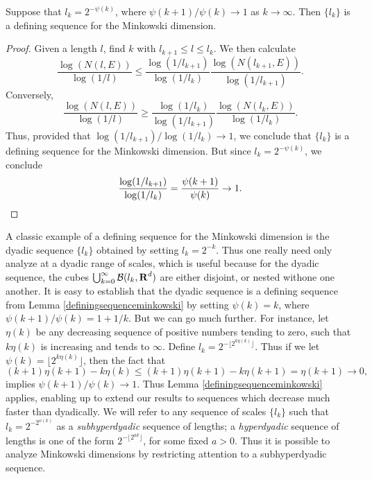 \begin{lemma} \label{definingsequenceminkowski}
	Suppose that $l_k = 2^{-\psi(k)}$, where $\psi(k+1)/\psi(k) \to 1$ as $k \to \infty$. Then $\{ l_k \}$ is a defining sequence for the Minkowski dimension.
\end{lemma}
\begin{proof}
	Given a length $l$, find $k$ with $l_{k+1} \leq l \leq l_k$. We then calculate
	\[ \frac{\log(N(l,E))}{\log(1/l)} \leq \frac{\log(1/l_{k+1})}{\log(1/l_k)} \frac{\log(N(l_{k+1},E))}{\log(1/l_{k+1})}. \]
	Conversely,
	\[ \frac{\log(N(l,E))}{\log(1/l)} \geq \frac{\log(1/l_k)}{\log(1/l_{k+1})} \frac{\log(N(l_k,E))}{\log(1/l_k)}. \]
	Thus, provided that $\log(1/l_{k+1})/\log(1/l_k) \to 1$, we conclude that $\{ l_k \}$ is a defining sequence for the Minkowski dimension. But since $l_k = 2^{-\psi(k)}$, we conclude
	\[ \frac{\log(1/l_{k+1})}{\log(1/l_k)} = \frac{\psi(k+1)}{\psi(k)} \to 1. \qedhere \]
\end{proof}

A classic example of a defining sequence for the Minkowski dimension is the dyadic sequence $\{ l_k \}$ obtained by setting $l_k = 2^{-k}$. Thus one really need only analyze at a dyadic range of scales, which is useful because for the dyadic sequence, the cubes $\bigcup_{k = 0}^\infty \operatorname{\mathcal{B}}(l_k, \operatorname{\mathbf{R}}^d)$ are either disjoint, or nested withone one another. It is easy to establish that the dyadic sequence is a defining sequence from Lemma \ref{definingsequenceminkowski} by setting $\psi(k) = k$, where $\psi(k+1)/\psi(k) = 1 + 1/k$. But we can go much further. For instance, let $\eta(k)$ be any decreasing sequence of positive numbers tending to zero, such that $k \eta(k)$ is increasing and tends to $\infty$. Define $l_k = 2^{-\lfloor 2^{k \eta(k)} \rfloor}$. Thus if we let $\psi(k) = \lfloor 2^{k \eta(k)} \rfloor$, then the fact that
%
\[ (k+1) \eta(k+1) - k \eta(k) \leq (k+1) \eta(k+1) - k \eta(k+1) = \eta(k+1) \to 0, \]
%
implies $\psi(k+1)/\psi(k) \to 1$. Thus Lemma \ref{definingsequenceminkowski} applies, enabling up to extend our results to sequences which decrease much faster than dyadically. We will refer to any sequence of scales $\{ l_k \}$ such that $l_k = 2^{-2^{o(k)}}$ as a \emph{subhyperdyadic} sequence of lengths; a \emph{hyperdyadic} sequence of lengths is one of the form $2^{-\lfloor 2^{ak} \rfloor}$, for some fixed $a > 0$. Thus it is possible to analyze Minkowski dimensions by restricting attention to a subhyperdyadic sequence.

%

